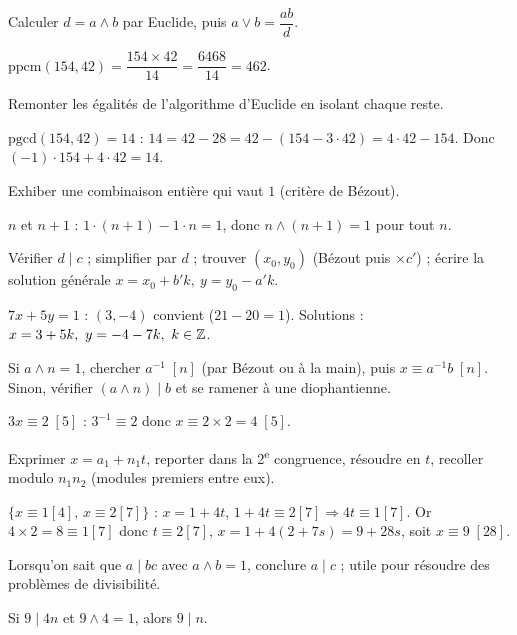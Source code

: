 Calculer $d=a\wedge b$ par Euclide, puis $a\vee b=\dfrac{ab}{d}$.
\begin{exemple}
$\mathrm{ppcm}(154,42)=\dfrac{154\times42}{14}=\dfrac{6468}{14}=462$.
\end{exemple}

Remonter les égalités de l'algorithme d'Euclide en isolant chaque reste.
\begin{exemple}
$\mathrm{pgcd}(154,42)=14$ : $14=42-28=42-(154-3\cdot42)=4\cdot42-154$. Donc
$(-1)\cdot154+4\cdot42=14$.
\end{exemple}

Exhiber une combinaison entière qui vaut $1$ (critère de Bézout).
\begin{exemple}
$n$ et $n+1$ : $1\cdot(n+1)-1\cdot n=1$, donc $n\wedge(n+1)=1$ pour tout $n$.
\end{exemple}

Vérifier $d\mid c$ ; simplifier par $d$ ; trouver $(x_0,y_0)$ (Bézout puis $\times c'$) ;
écrire la solution générale $x=x_0+b'k,\ y=y_0-a'k$.
\begin{exemple}
$7x+5y=1$ : $(3,-4)$ convient ($21-20=1$). Solutions : $x=3+5k,\ y=-4-7k,\ k\in\Z$.
\end{exemple}

Si $a\wedge n=1$, chercher $a^{-1}\;[n]$ (par Bézout ou à la main), puis
$x\equiv a^{-1}b\;[n]$. Sinon, vérifier $(a\wedge n)\mid b$ et se ramener à une diophantienne.
\begin{exemple}
$3x\equiv2\;[5]$ : $3^{-1}\equiv2$ donc $x\equiv2\times2=4\;[5]$.
\end{exemple}

Exprimer $x=a_1+n_1t$, reporter dans la 2\textsuperscript{e} congruence, résoudre en $t$,
recoller modulo $n_1n_2$ (modules premiers entre eux).
\begin{exemple}
$\{x\equiv1[4],\,x\equiv2[7]\}$ : $x=1+4t$, $1+4t\equiv2[7]\Rightarrow4t\equiv1[7]$. Or
$4\times2=8\equiv1[7]$ donc $t\equiv2[7]$, $x=1+4(2+7s)=9+28s$, soit $x\equiv9\;[28]$.
\end{exemple}

Lorsqu'on sait que $a\mid bc$ avec $a\wedge b=1$, conclure $a\mid c$ ; utile pour résoudre des
problèmes de divisibilité.
\begin{exemple}
Si $9\mid 4n$ et $9\wedge4=1$, alors $9\mid n$.
\end{exemple}

